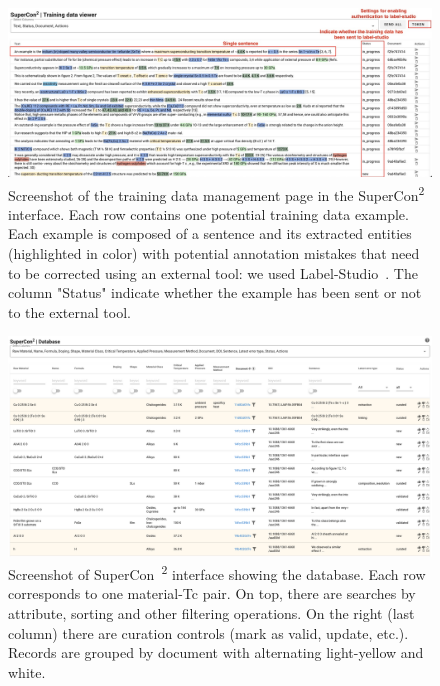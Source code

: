 \documentclass[]{interact}
\theoremstyle{plain} %
\theoremstyle{definition}
\theoremstyle{remark}
\begin{document}
\begin{figure}[ht]
  \centering
  \includegraphics[width=1\textwidth]{images/training-data-viewer} 
  \caption{Screenshot of the training data management page in the SuperCon\textsuperscript{2} interface. Each row contains one potential training data example. Each example is composed of a sentence and its extracted entities (highlighted in color) with potential annotation mistakes that need to be corrected using an external tool: we used Label-Studio~\cite{Label_Studio}. The column "Status" indicate whether the example has been sent or not to the external tool.}
  \label{fig:training-data-view}
\end{figure}

\begin{figure}[ht]
  \centering
  \includegraphics[width=1\textwidth]{images/supercon-curation-database} 
  \caption{Screenshot of SuperCon~\textsuperscript{2} interface showing the database. Each row corresponds to one material-Tc pair. On top, there are searches by attribute, sorting and other filtering operations. On the right (last column) there are curation controls (mark as valid, update, etc.).   Records are grouped by document with alternating light-yellow and white. }
  \label{fig:curation-interface-database}
\end{figure}
\end{document}
